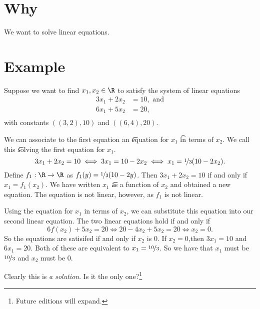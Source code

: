 
\section*{Why}

We want to solve linear equations.

\section*{Example}

Suppose we want to find $x_1, x_2 \in \R $ to satisfy the system of linear equations
\[
\begin{aligned}
3x_1 + 2x_2 &= 10, \text{ and} \\
6x_1 + 5x_2 &= 20, \\
\end{aligned}
\]
with constants $((3, 2), 10)$ and $((6, 4), 20)$.

We can associate to the first equation an \t{equation for} $x_1$ \t{in terms of} $x_2$.
We call this \t{solving the first equation for $x_1$}.
\[
3x_1 + 2x_2 = 10 \iff 3x_1 = 10 - 2x_2 \iff x_1 = \nicefrac{1}{3}(10 - 2x_2).
\]
Define $f_1: \R  \to \R $ as $f_1(y) = \nicefrac{1}{3}(10 - 2y)$.
Then $3x_1 + 2x_2 = 10$ if and only if $x_1 = f_1(x_2)$.
We have written $x_1$ \t{as a function} of $x_2$ and obtained a new equation.
The equation is not linear, however, as $f_1$ is not linear.

Using the equation for $x_1$ in terms of $x_2$, we can substitute this equation into our second linear equation.
The two linear equations hold if and only if
\[
6f(x_2) + 5x_2 = 20 \iff 20 - 4x_2 + 5x_2 = 20 \iff x_2 = 0.
\]
So the equations are satisifed if and only if $x_2$ is $0$.
If $x_2 = 0$,then $3x_1 = 10$ and $6x_1 = 20$.
Both of these are equivalent to $x_1 = \nicefrac{10}{3}$.
So we have that $x_1$ must be $\nicefrac{10}{3}$ and $x_2$ must be 0.

Clearly this is \textit{a solution}.
Is it the only one?\footnote{Future editions will expand.}

\blankpage